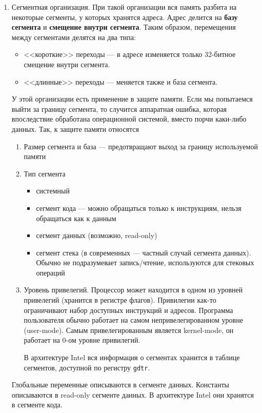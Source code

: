 \begin{enumerate}
\item Сегментная организация. При такой организации вся память разбита на некоторые сегменты, у которых хранятся адреса. Адрес делится на \textbf{базу сегмента} и \textbf{смещение внутри сегмента}. Таким образом, перемещения между сегментами делятся на два типа:
\begin{itemize}
\item <<короткие>> переходы --- в адресе изменяется только 32-битное смещение внутри сегмента.
\item <<длинные>> переходы --- меняется также и база сегмента.
\end{itemize}
У этой организации есть применение в защите памяти. Если мы попытаемся выйти за границу сегмента, то случится аппаратная ошибка, которая впоследствие обработана операционной системой, вместо порчи каки-либо данных. Так, к защите памяти относятся
\begin{enumerate}
\item Размер сегмента и база --- предотвращают выход за границу используемой памяти
\item Тип сегмента
\begin{itemize}
\item системный
\item сегмент кода --- можно обращаться только к инструкциям, нельзя обращаться как к данным
\item сегмент данных (возможно, read-only)
\item сегмент стека (в современных --- частный случай сегмента данных). Обычно не подразумевает запись/чтение, используются для стековых операций
\end{itemize}
\item Уровень привелегий. Процессор может находится в одном из уровней привелегий (хранится в регистре флагов). Привилегии как-то ограничивают набор доступных инструкций и адресов. Программа пользователя обычно работает на самом непривелегированном уровне (user-mode). Самым привелегированным является kernel-mode, он работает на 0-ом уровне привилегий.

В архитектуре Intel вся информация о сегментах хранится в таблице сегментов, доступной по регистру \verb!gdtr!.
\end{enumerate}
Глобальные переменные описываются в сегменте данных.
Константы описываются в read-only сегменте данных. В архитектуре Intel они хранятся в сегменте кода.
\end{enumerate}

